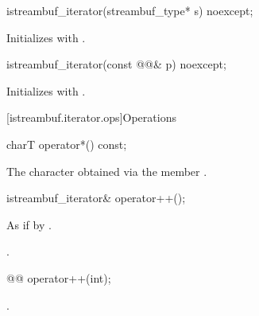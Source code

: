 \begin{indexed}{}
\begin{itemdecl}
istreambuf_iterator(streambuf_type* s) noexcept;
\end{itemdecl}
\end{indexed}

\begin{itemdescr}
\pnum
\effects
Initializes  with .
\end{itemdescr}

\begin{indexed}{}
\begin{itemdecl}
istreambuf_iterator(const @@& p) noexcept;
\end{itemdecl}
\end{indexed}

\begin{itemdescr}
\pnum
\effects
Initializes  with .
\end{itemdescr}

[istreambuf.iterator.ops]{Operations}

%
\begin{itemdecl}
charT operator*() const;
\end{itemdecl}

\begin{itemdescr}
\pnum
\returns
The character obtained via the
member
.
\end{itemdescr}

%
\begin{itemdecl}
istreambuf_iterator& operator++();
\end{itemdecl}

\begin{itemdescr}
\pnum
\effects
As if by .

\pnum
\returns
{}.
\end{itemdescr}

%
\begin{itemdecl}
@@ operator++(int);
\end{itemdecl}

\begin{itemdescr}
\pnum
\returns
{}.
\end{itemdescr}

